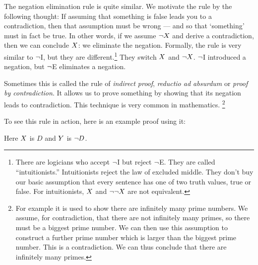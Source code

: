 The negation elimination rule is quite similar.
%
We motivate the rule by the following thought:
If assuming that something is false leads you to a contradiction, then that assumption must be wrong --- and so that `something' must in fact be true. In other words, if we assume $\neg X$ and derive a contradiction, then we can conclude $X$: we eliminate the negation.
Formally, the rule is very similar to $\neg$I, but they are different.\footnote{There are logicians who accept $\neg$I but reject $\neg$E. They are called ``intuitionists.'' Intuitionists reject the law of excluded middle. They don't buy our basic assumption that every sentence has one of two truth values, true or false. For intuitionists, $X$ and $\neg\neg X$ are not equivalent. 
} They switch $X$ and $\neg X$. 
 $\neg$I introduced a negation, but $\neg$E eliminates a negation.
 
Sometimes this is called the rule of \emph{indirect proof}, \emph{reductio ad absurdum} or \emph{proof by contradiction}. It allows us to prove something by showing that its negation leads to contradiction. This technique is very common in mathematics.%
\footnote{
For example it is used to show there are infinitely many prime numbers. We assume, for contradiction, that there are not infinitely many primes, so there must be a biggest prime number. We can then use this assumption to construct a further prime number which is larger than the biggest prime number. This is a contradiction. We can thus conclude that there are infinitely many primes.
}



To see this rule in action, here is an example proof using it:
	\begin{fitchproof}
		\open
		\close
	\end{fitchproof}
	Here $X$ is $D$ and $Y$ is $\neg D$. 



